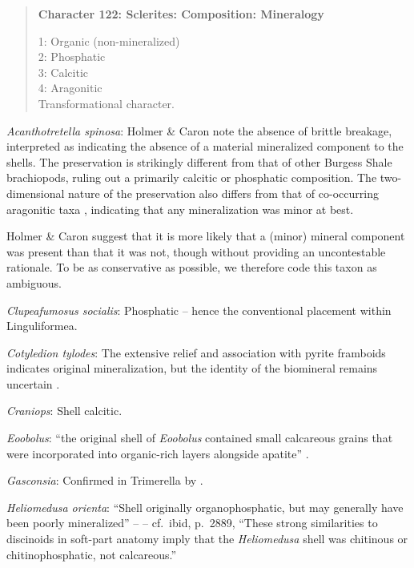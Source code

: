 \documentclass[openany]{book}
\theoremstyle{definition}
\theoremstyle{definition}
\theoremstyle{definition}
\theoremstyle{remark}
\begin{document}
\begin{quote}
\textbf{Character 122: Sclerites: Composition: Mineralogy}

1: Organic (non-mineralized)\\
2: Phosphatic\\
3: Calcitic\\
4: Aragonitic\\
Transformational character.
\end{quote}

\hypertarget{Acanthotretella_spinosa-coding-122}{}
\emph{Acanthotretella spinosa}: Holmer \& Caron
\citeyearpar{Holmer2006Aspinose} note the absence of brittle breakage,
interpreted as indicating the absence of a material mineralized
component to the shells. The preservation is strikingly different from
that of other Burgess Shale brachiopods, ruling out a primarily calcitic
or phosphatic composition. The two-dimensional nature of the
preservation also differs from that of co-occurring aragonitic taxa
\citep[hyoliths;][ p.~273]{Holmer2006Aspinose}, indicating that any
mineralization was minor at best.

Holmer \& Caron \citeyearpar[p.~286]{Holmer2006Aspinose} suggest that it
is more likely that a (minor) mineral component was present than that it
was not, though without providing an uncontestable rationale. To be as
conservative as possible, we therefore code this taxon as ambiguous.

\hypertarget{Clupeafumosus_socialis-coding-122}{}
\emph{Clupeafumosus socialis}: Phosphatic -- hence the conventional
placement within Linguliformea.

\hypertarget{Cotyledion_tylodes-coding-122}{}
\emph{Cotyledion tylodes}: The extensive relief and association with
pyrite framboids indicates original mineralization, but the identity of
the biomineral remains uncertain \citep{Zhang2013}.

\hypertarget{Craniops-coding-122}{}
\emph{Craniops}: Shell calcitic.

\hypertarget{Eoobolus-coding-122}{}
\emph{Eoobolus}: ``the original shell of \emph{Eoobolus} contained small
calcareous grains that were incorporated into organic-rich layers
alongside apatite'' \citep{Balthasar2007Anearly}.

\hypertarget{Gasconsia-coding-122}{}
\emph{Gasconsia}: Confirmed in Trimerella by
\citet{Balthasar2011Relicaragonite}.

\hypertarget{Heliomedusa_orienta-coding-122}{}
\emph{Heliomedusa orienta}: ``Shell originally organophosphatic, but may
generally have been poorly mineralized'' --
\citet{Williams2007Supplement} -- cf.~ibid, p.~2889, ``These strong
similarities to discinoids in soft-part anatomy imply that the
\emph{Heliomedusa} shell was chitinous or chitinophosphatic, not
calcareous.''
\end{document}
